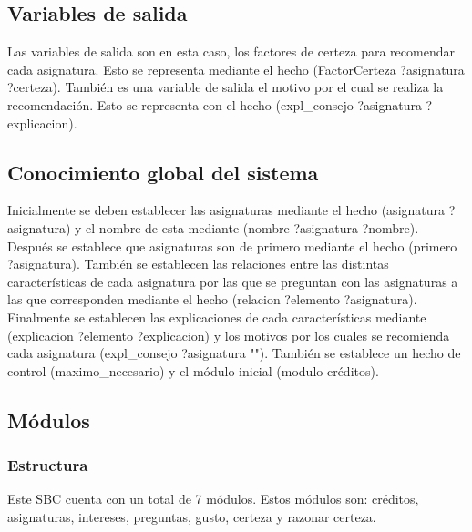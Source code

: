 \subsection{Variables de salida}
Las variables de salida son en esta caso, los factores de certeza para recomendar cada asignatura. Esto se representa mediante el hecho (FactorCerteza ?asignatura ?certeza). También es una variable de salida el motivo por el cual se realiza la recomendación. Esto se representa con el hecho (expl\_consejo ?asignatura ?explicacion).
\subsection{Conocimiento global del sistema}
Inicialmente se deben establecer las asignaturas mediante el hecho (asignatura ?asignatura) y el nombre de esta mediante (nombre ?asignatura ?nombre). Después se establece que asignaturas son de primero mediante el hecho (primero ?asignatura). También se establecen las relaciones entre las distintas características de cada asignatura por las que se preguntan con las asignaturas a las que corresponden mediante el hecho (relacion ?elemento ?asignatura). Finalmente se establecen las explicaciones de cada características mediante (explicacion ?elemento ?explicacion) y los motivos por los cuales se recomienda cada asignatura (expl\_consejo ?asignatura ""). También se establece un hecho de control (maximo\_necesario) y el módulo inicial (modulo créditos).
\subsection{Módulos}
\subsubsection{Estructura}
Este SBC cuenta con un total de 7 módulos. Estos módulos son: créditos, asignaturas, intereses, preguntas, gusto, certeza y razonar certeza.
